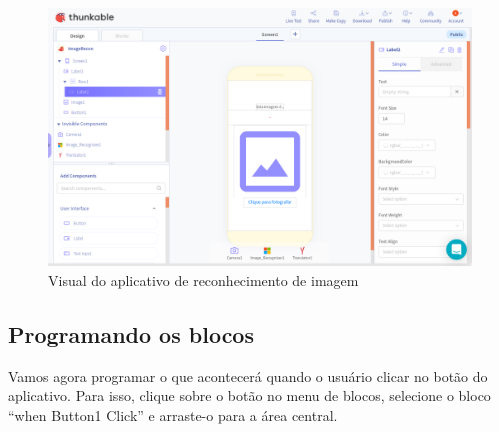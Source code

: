 \documentclass[11pt,fleqn]{book} %
\begin{document}
\begin{figure}[H]
	\centering
    \includegraphics[width=\textwidth]{Pictures/GuiaThunkReconTela.png}
    \caption{Visual do aplicativo de reconhecimento de imagem}\label{fig:apprecondesign}
\end{figure}

\subsection{Programando os blocos}

Vamos agora programar o que acontecerá quando o usuário clicar no botão do aplicativo. Para isso, clique sobre o botão no menu de blocos, selecione o bloco ``when Button1 Click'' e arraste-o para a área central.
\end{document}
